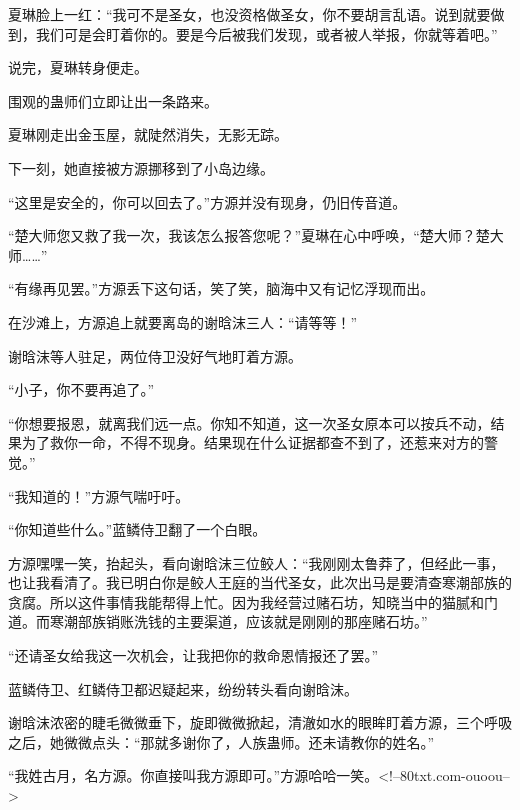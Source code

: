 \begin{this_body}
夏琳脸上一红：“我可不是圣女，也没资格做圣女，你不要胡言乱语。说到就要做到，我们可是会盯着你的。要是今后被我们发现，或者被人举报，你就等着吧。”

说完，夏琳转身便走。

围观的蛊师们立即让出一条路来。

夏琳刚走出金玉屋，就陡然消失，无影无踪。

下一刻，她直接被方源挪移到了小岛边缘。

“这里是安全的，你可以回去了。”方源并没有现身，仍旧传音道。

“楚大师您又救了我一次，我该怎么报答您呢？”夏琳在心中呼唤，“楚大师？楚大师……”

“有缘再见罢。”方源丢下这句话，笑了笑，脑海中又有记忆浮现而出。

在沙滩上，方源追上就要离岛的谢晗沫三人：“请等等！”

谢晗沫等人驻足，两位侍卫没好气地盯着方源。

“小子，你不要再追了。”

“你想要报恩，就离我们远一点。你知不知道，这一次圣女原本可以按兵不动，结果为了救你一命，不得不现身。结果现在什么证据都查不到了，还惹来对方的警觉。”

“我知道的！”方源气喘吁吁。

“你知道些什么。”蓝鳞侍卫翻了一个白眼。

方源嘿嘿一笑，抬起头，看向谢晗沫三位鲛人：“我刚刚太鲁莽了，但经此一事，也让我看清了。我已明白你是鲛人王庭的当代圣女，此次出马是要清查寒潮部族的贪腐。所以这件事情我能帮得上忙。因为我经营过赌石坊，知晓当中的猫腻和门道。而寒潮部族销账洗钱的主要渠道，应该就是刚刚的那座赌石坊。”

“还请圣女给我这一次机会，让我把你的救命恩情报还了罢。”

蓝鳞侍卫、红鳞侍卫都迟疑起来，纷纷转头看向谢晗沫。

谢晗沫浓密的睫毛微微垂下，旋即微微掀起，清澈如水的眼眸盯着方源，三个呼吸之后，她微微点头：“那就多谢你了，人族蛊师。还未请教你的姓名。”

“我姓古月，名方源。你直接叫我方源即可。”方源哈哈一笑。<!--80txt.com-ouoou-->

\end{this_body}

